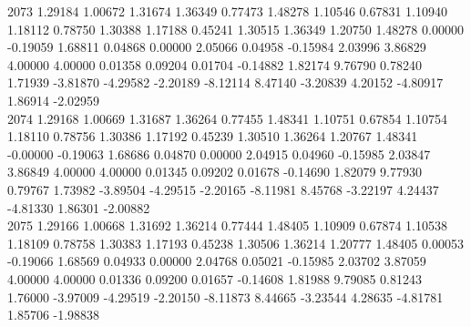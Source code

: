 {2073 1.29184 1.00672 1.31674 1.36349 0.77473 1.48278 1.10546 0.67831 1.10940 1.18112 0.78750 1.30388 1.17188 0.45241 1.30515 1.36349 1.20750 1.48278 0.00000 -0.19059 1.68811 0.04868 0.00000 2.05066 0.04958 -0.15984 2.03996 3.86829 4.00000 4.00000 0.01358 0.09204 0.01704 -0.14882 1.82174 9.76790 0.78240 1.71939 -3.81870 -4.29582 -2.20189 -8.12114 8.47140 -3.20839 4.20152 -4.80917 1.86914 -2.02959 \\
2074 1.29168 1.00669 1.31687 1.36264 0.77455 1.48341 1.10751 0.67854 1.10754 1.18110 0.78756 1.30386 1.17192 0.45239 1.30510 1.36264 1.20767 1.48341 -0.00000 -0.19063 1.68686 0.04870 0.00000 2.04915 0.04960 -0.15985 2.03847 3.86849 4.00000 4.00000 0.01345 0.09202 0.01678 -0.14690 1.82079 9.77930 0.79767 1.73982 -3.89504 -4.29515 -2.20165 -8.11981 8.45768 -3.22197 4.24437 -4.81330 1.86301 -2.00882 \\
2075 1.29166 1.00668 1.31692 1.36214 0.77444 1.48405 1.10909 0.67874 1.10538 1.18109 0.78758 1.30383 1.17193 0.45238 1.30506 1.36214 1.20777 1.48405 0.00053 -0.19066 1.68569 0.04933 0.00000 2.04768 0.05021 -0.15985 2.03702 3.87059 4.00000 4.00000 0.01336 0.09200 0.01657 -0.14608 1.81988 9.79085 0.81243 1.76000 -3.97009 -4.29519 -2.20150 -8.11873 8.44665 -3.23544 4.28635 -4.81781 1.85706 -1.98838 \\
}\fcmacro
